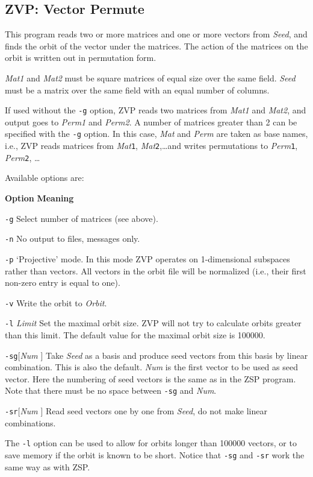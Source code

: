 \subsection{ZVP: Vector Permute}
\Syntax
{}

\Description
This program reads two or more matrices and one
or more vectors from {\it Seed}, and finds the orbit of the vector
under the matrices. The action of the matrices on the orbit is
written out in permutation form.

{\it Mat1} and {\it Mat2} must be square matrices of equal size
over the same field. {\it Seed} must be a matrix over the same
field with an equal number of columns.

If used without the {\tt -g} option, ZVP reads two matrices from
{\it Mat1} and {\it Mat2}, and output goes to {\it Perm1} and
{\it Perm2}. A number of matrices greater than 2 can be specified with
the {\tt -g} option. In this case, {\it Mat} and {\it Perm} are
taken as base names, i.e., ZVP reads matrices from {\it Mat}{\tt 1},
{\it Mat}{\tt 2},\ldots and writes permutations to
{\it Perm}{\tt 1}, {\it Perm}{\tt 2}, \ldots

Available options are:
\nopagebreak
\begin{list}{}{ \leftmargin 2cm \parsep 0mm
\itemsep 0mm}
\item[{\bf Option}] {\bf Meaning}
\nopagebreak
\item[{\tt -g}]	Select number of matrices (see above).
\item[{\tt -n}]	No output to files, messages only.
\item[{\tt -p}]	`Projective' mode. In this mode ZVP operates on
	1-dimensional subspaces rather than vectors. All vectors
	in the orbit file will be normalized (i.e., their first
	non-zero entry is equal to one).
\item[{\tt -v}]	Write the orbit to {\it Orbit}.
\item[{\tt -l} {\it Limit}] Set the maximal orbit size. ZVP
	will not try to calculate orbits greater than this limit.
	The default value for the maximal orbit size is 100000.
\item[{\tt -sg}[{\it Num}]]
	Take {\it Seed} as a basis and produce seed vectors from this
	basis by linear combination. This is also the default.
	{\it Num} is the first vector to be used as seed vector. Here
	the numbering of seed vectors is the same as in the ZSP program.
	Note that there must be no space between {\tt -sg} and
	{\it Num}.
\item[{\tt -sr}[{\it Num}]]
	Read seed vectors one by one from {\it Seed}, do not make
	linear combinations.
\end{list}
The {\tt -l} option can be used to allow for orbits longer than
100000 vectors, or to save memory if the orbit is known to be
short. Notice that {\tt -sg} and {\tt -sr} work the same way as with
ZSP.

